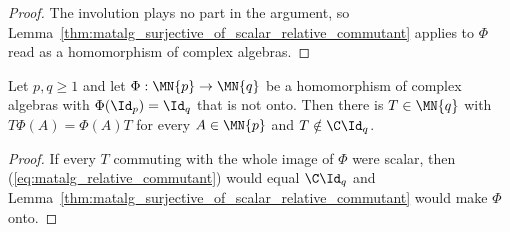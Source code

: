 \begin{proof}\leanok
    The involution plays no part in the argument, so
    Lemma~\ref{thm:matalg_surjective_of_scalar_relative_commutant}
    applies to $\Phi$ read as a homomorphism of complex algebras.
\end{proof}

\begin{lemma}
    \label{thm:matalg_nonscalar_relative_commutant}
    \leanok
    Let $p,q\geq1$ and let $\Phi:\MN{p}\to\MN{q}$ be a homomorphism of
    complex algebras with $\Phi(\Id_p)=\Id_q$ that is not onto.  Then there
    is $T\in\MN{q}$ with $T\Phi(A)=\Phi(A)T$ for every $A\in\MN{p}$ and
    $T\notin\C\Id_q$.
\end{lemma}

\begin{proof}\leanok
    If every $T$ commuting with the whole image of $\Phi$ were scalar, then
    (\ref{eq:matalg_relative_commutant}) would equal $\C\Id_q$ and
    Lemma~\ref{thm:matalg_surjective_of_scalar_relative_commutant} would
    make $\Phi$ onto.
\end{proof}
